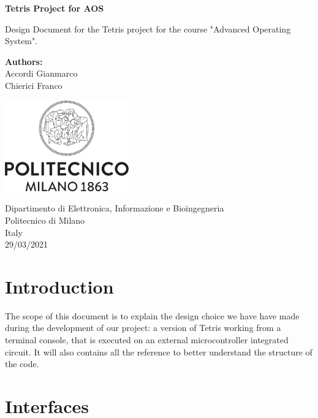 \documentclass{article}
\begin{document}
\begin{titlepage}
    \begin{center}
       \vspace*{4cm}

       \textbf{\LARGE Tetris Project for AOS}

       \vspace{1.5cm}
        Design Document for the Tetris project for the course "Advanced Operating System".
            
       \vfill

       \textbf{Authors:}\\
       Accordi Gianmarco\\
       Chierici Franco

       \vspace{0.8cm}
     
       \includegraphics[width=0.4\textwidth]{img/Logo_Politecnico_Milano.png}
            
       Dipartimento di Elettronica, Informazione e Bioingegneria\\
       Politecnico di Milano\\
       Italy\\
       29/03/2021
            
   \end{center}
\end{titlepage}

\tableofcontents

\newpage

\section{Introduction}
The scope of this document is to explain the design choice we have have made during the development of our project: a version of Tetris working from a terminal console, that is executed on an external microcontroller integrated circuit. 
It will also contains all the reference to better understand the structure of the code.

\section{Interfaces}
\end{document}
